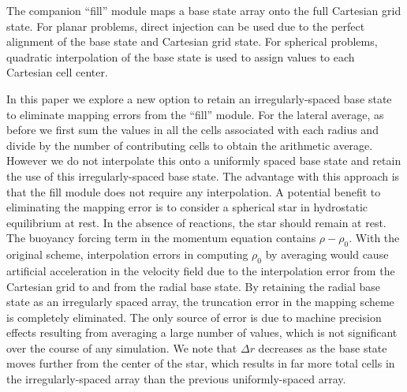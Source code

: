 The companion ``fill'' module maps a base state array onto the full Cartesian grid state.
For planar problems, direct injection can be used due to the perfect alignment of the base state and Cartesian grid state.
For spherical problems, quadratic interpolation of the base state is used to assign values to each Cartesian cell center.

In this paper we explore a new option to retain an irregularly-spaced base state to eliminate mapping errors from the ``fill'' module.
For the lateral average, as before we first sum the values in all the cells associated with each radius and divide
by the number of contributing cells to obtain the arithmetic average.  However we do not interpolate this onto a uniformly spaced
base state and retain the use of this irregularly-spaced base state.
The advantage with this approach is that the fill module does not require any interpolation.
A potential benefit to eliminating the mapping error is to consider a spherical star in hydrostatic equilibrium at rest.
In the absence of reactions, the star should remain at rest.
The buoyancy forcing term in the momentum equation contains $\rho-\rho_0$.  With the original scheme, interpolation errors 
in computing $\rho_0$ by averaging would cause artificial acceleration in the velocity field due to the interpolation error 
from the Cartesian grid to and from the radial base state.  By retaining the radial base state as an irregularly spaced array, 
{the truncation error in the mapping scheme is completely eliminated.  The only source of error is due to machine precision effects resulting 
from averaging a large number of values, which is not significant over the course of any simulation.}
We note that $\Delta r$ decreases as the base state moves further from the center of the star, 
which results in far more total cells in the irregularly-spaced array than the previous uniformly-spaced array. 

